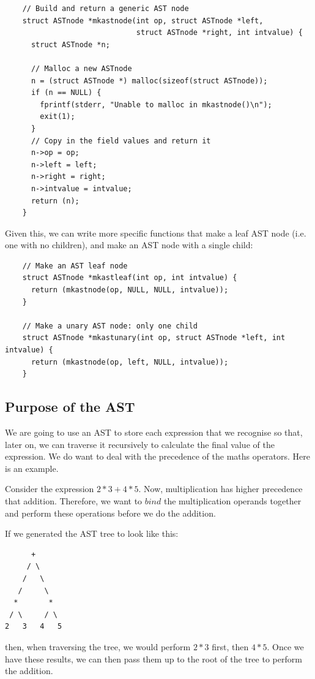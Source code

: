 \documentclass[a4paper,12pt]{article}
\begin{document}
\begin{lstlisting}
    // Build and return a generic AST node
    struct ASTnode *mkastnode(int op, struct ASTnode *left,
                              struct ASTnode *right, int intvalue) {
      struct ASTnode *n;

      // Malloc a new ASTnode
      n = (struct ASTnode *) malloc(sizeof(struct ASTnode));
      if (n == NULL) {
        fprintf(stderr, "Unable to malloc in mkastnode()\n");
        exit(1);
      }
      // Copy in the field values and return it
      n->op = op;
      n->left = left;
      n->right = right;
      n->intvalue = intvalue;
      return (n);
    }
\end{lstlisting}

Given this, we can write more specific functions that make a leaf AST node (i.e. one with no children), and make an AST node with a single child:

\begin{lstlisting}
    // Make an AST leaf node
    struct ASTnode *mkastleaf(int op, int intvalue) {
      return (mkastnode(op, NULL, NULL, intvalue));
    }

    // Make a unary AST node: only one child
    struct ASTnode *mkastunary(int op, struct ASTnode *left, int intvalue) {
      return (mkastnode(op, left, NULL, intvalue));
    }
\end{lstlisting}

\subsection{Purpose of the AST}

We are going to use an AST to store each expression that we recognise so that, later on, we can traverse it recursively to calculate the final value of the expression. We do want to deal with the precedence of the maths operators. Here is an example.

Consider the expression $2*3+4*5$. Now, multiplication has higher precedence that addition. Therefore, we want to $bind$ the multiplication operands together and perform these operations before we do the addition.

If we generated the AST tree to look like this:

\begin{lstlisting}
      +
     / \
    /   \
   /     \
  *       *
 / \     / \
2   3   4   5
\end{lstlisting}

then, when traversing the tree, we would perform $2*3$ first, then $4*5$. Once we have these results, we can then pass them up to the root of the tree to perform the addition.
\end{document}
